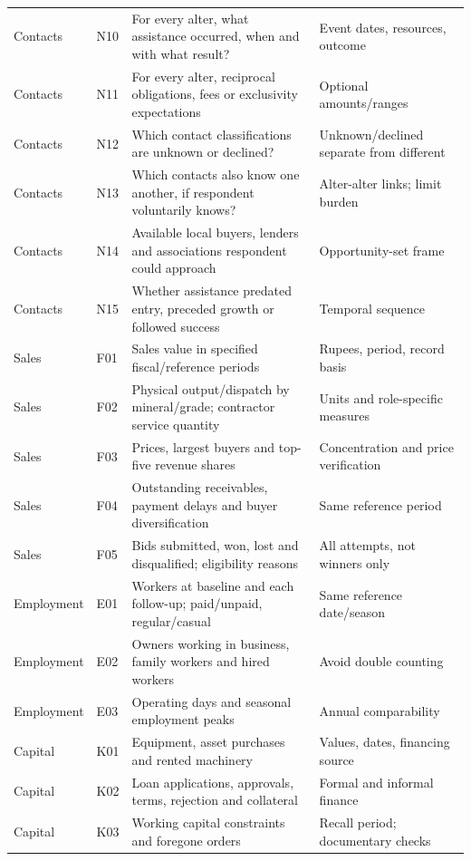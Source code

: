 \documentclass[11pt,a4paper]{report}
\begin{document}
\begin{longtable}{>{\raggedright\arraybackslash}p{1.8cm}l>{\raggedright\arraybackslash}p{7.5cm}>{\raggedright\arraybackslash}p{4.5cm}}
Contacts & N10 & For every alter, what assistance occurred, when and with what result? & Event dates, resources, outcome \\
Contacts & N11 & For every alter, reciprocal obligations, fees or exclusivity expectations & Optional amounts/\allowbreak{}ranges \\
Contacts & N12 & Which contact classifications are unknown or declined? & Unknown/\allowbreak{}declined separate from different \\
Contacts & N13 & Which contacts also know one another, if respondent voluntarily knows? & Alter-alter links; limit burden \\
Contacts & N14 & Available local buyers, lenders and associations respondent could approach & Opportunity-set frame \\
Contacts & N15 & Whether assistance predated entry, preceded growth or followed success & Temporal sequence \\
Sales & F01 & Sales value in specified fiscal/\allowbreak{}reference periods & Rupees, period, record basis \\
Sales & F02 & Physical output/\allowbreak{}dispatch by mineral/\allowbreak{}grade; contractor service quantity & Units and role-specific measures \\
Sales & F03 & Prices, largest buyers and top-five revenue shares & Concentration and price verification \\
Sales & F04 & Outstanding receivables, payment delays and buyer diversification & Same reference period \\
Sales & F05 & Bids submitted, won, lost and disqualified; eligibility reasons & All attempts, not winners only \\
Employment & E01 & Workers at baseline and each follow-up; paid/\allowbreak{}unpaid, regular/\allowbreak{}casual & Same reference date/\allowbreak{}season \\
Employment & E02 & Owners working in business, family workers and hired workers & Avoid double counting \\
Employment & E03 & Operating days and seasonal employment peaks & Annual comparability \\
Capital & K01 & Equipment, asset purchases and rented machinery & Values, dates, financing source \\
Capital & K02 & Loan applications, approvals, terms, rejection and collateral & Formal and informal finance \\
Capital & K03 & Working capital constraints and foregone orders & Recall period; documentary checks \\

\end{longtable}
\end{document}
